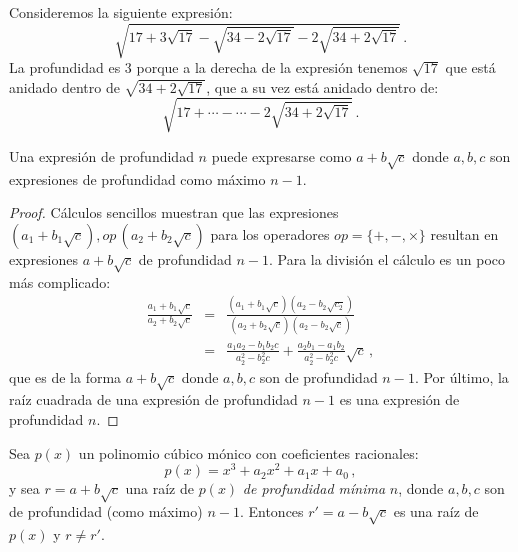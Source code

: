 \begin{example}
Consideremos la siguiente expresión:
\[
\sqrt{17+3\sqrt{17} - \sqrt{34-2\sqrt{17}}
  -2\sqrt{34+2\sqrt{17}} }\,.
\]
La profundidad es $3$ porque a la derecha de la expresión tenemos $\sqrt{17}$ que está anidado dentro de $\sqrt{34+2\sqrt{17}}$, que a su vez está anidado dentro de:
\[
\sqrt{17+\cdots-\cdots-2\sqrt{34+2\sqrt{17}}}\,.
\]
\end{example}

\begin{theorem}
Una expresión de profundidad $n$ puede expresarse como $a+b\sqrt{c}$ donde $a,b,c$ son expresiones de profundidad como máximo $n-1$.
\end{theorem}
\begin{proof}
Cálculos sencillos muestran que las expresiones $(a_1+b_1\sqrt{c}),\mathit{op}\,(a_2+b_2\sqrt{c})$ para los operadores $\mathit{op}=\{+,-,\times\}$ resultan en expresiones $a+b\sqrt{c}$ de profundidad $n-1$. Para la división el cálculo es un poco más complicado:
\begin{eqnarray*}
\frac{a_1+b_1\sqrt{c}}{a_2+b_2\sqrt{c}}&=&
\frac{(a_1+b_1\sqrt{c})(a_2-b_2\sqrt{c_2})}{(a_2+b_2\sqrt{c})(a_2-b_2\sqrt{c})}\\
&=&\frac{a_1a_2-b_1b_2c}{a_2^2-b_2^2c}+\frac{a_2b_1-a_1b_2}{a_2^2-b_2^2c}\sqrt{c}\,,
\end{eqnarray*}
que es de la forma $a+b\sqrt{c}$ donde $a,b,c$ son de profundidad $n-1$.
Por último, la raíz cuadrada de una expresión de profundidad $n-1$ es una expresión de profundidad $n$.
\end{proof}

\begin{theorem}\label{thm.trisect.conjugate}
Sea $p(x)$ un polinomio cúbico mónico con coeficientes racionales:
\[
p(x)=x^3+a_2x^2+a_1x+a_0\,,
\]
y sea $r=a+b\sqrt{c}$ una raíz de $p(x)$ \emph{de profundidad mínima} $n$, donde $a,b,c$ son de profundidad (como máximo) $n-1$. Entonces $r'=a-b\sqrt{c}$ es una raíz de $p(x)$ y $r\neq r'$.
\end{theorem}

